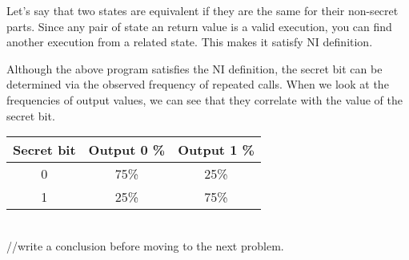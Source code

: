\documentclass[onecolumn]{paper}
\begin{document}
Let's say that two states are equivalent if they are the same for their non-secret parts. Since any pair of state an return value is a valid execution, you can find another execution from a related state. This makes it satisfy NI definition.

\begin{comment}
Here is a table for all possible ways an execution of above function could go:\\

\begin{tabular}{| c | c | c | c | c |}
	\hline
	 & Secret Bit & First Random Bit & Output & Noninterfering Execution \\
	\hline
	a &	0 & 0 & 0 & d \\
	\hline
	b &	0 & 0 & 1 & e \\
	\hline
	c &	0 & 1 & 0 & d \\
	\hline
	\hline
	d &	1 & 0 & 0 & a \\
	\hline
	e &	1 & 0 & 1 & b \\
	\hline
	f &	1 & 1 & 1 & b \\
	\hline
\end{tabular}\\

For each state and an execution from it, there is a corresponding execution from each related state with same return value. If a related state has same secret bit value, first execution is also the second execution. If a related state has opposite secret bit value, then corresponding execution is given in the above table. This demonstrates how given code snippet satisfies NI.
\end{comment}

Although the above program satisfies the NI definition, the secret bit can be determined via the observed frequency of repeated calls. When we look at the frequencies of output values, we can see that they correlate with the value of the secret bit.\\

\begin{tabular}{| c | c | c |}
	\hline
	Secret bit & Output 0 \% & Output 1 \% \\
	\hline
	0 &	75\% & 25\% \\
	\hline
	1 &	25\% & 75\% \\
	\hline
\end{tabular}\\

//write a conclusion before moving to the next problem.
 
\end{document}
